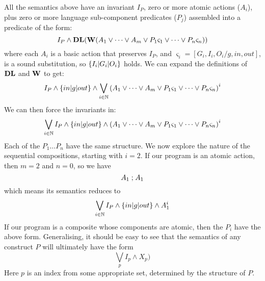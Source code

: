 All the semantics above have an invariant $I_P$,
zero or more atomic actions ($A_i$),
plus zero or more language sub-component predicates ($P_j$)
assembled into a predicate of the form:
\[
  I_P
  \land
  \mathbf{DL}(\mathbf{W}( A_1 \lor \dots \lor A_m
     \lor
     P_1\varsigma_1 \lor \dots \lor P_n\varsigma_n ))
\]
where each $A_i$ is a basic action that preserves $I_P$,
and $\varsigma_i = [G_i,I_i,O_i/g,in,out]$,
is a sound substitution, so $\{I_i|G_i|O_i\}$ holds.
We can expand the definitions of $\mathbf{DL}$ and $\mathbf{W}$ to get:
\[
  I_P \land \{in|g|out\}
  \land
  \bigvee_{i \in \mathbb{N}}
    \left( A_1 \lor \dots \lor A_m
          \lor
          P_1\varsigma_1 \lor \dots \lor P_n\varsigma_n
    \right)^i
\]
We can then force the invariants in:
\[
    \bigvee_{i \in \mathbb{N}}
      I_P \land \{in|g|out\}
      \land
       \left( A_1 \lor \dots \lor A_m
             \lor
             P_1\varsigma_1 \lor \dots \lor P_n\varsigma_n
       \right)^i
\]
Each of the $P_1 \dots P_n$ have the same structure.
We now explore the nature of the sequential compositions,
starting with $i=2$.
If our program is an atomic action, then $m=2$ and $n=0$, so
we have
\[
  A_1 \mathrel{;} A_1
\]
which means its semantics reduces to
\[
 \bigvee_{i \in \mathbb{N} }I_P \land \{in|g|out\} \land A_1^i
\]
If our program is a composite whose components are atomic,
then the $P_i$ have the above form.
Generalising, it should be easy to see that the semantics of any construct $P$
will ultimately have the form
\[
  \bigvee_p  I_p \land X_p)
\]
Here $p$ is an index from some appropriate set,
determined by the structure of $P$.

